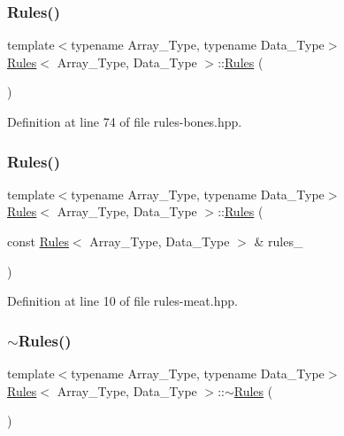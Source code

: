 \subsubsection{\texorpdfstring{Rules()}{Rules()}\hspace{0.1cm}{\footnotesize\ttfamily [1/2]}}
{\footnotesize\ttfamily template$<$typename Array\+\_\+\+Type, typename Data\+\_\+\+Type$>$ \\
\hyperlink{class_rules}{Rules}$<$ Array\+\_\+\+Type, Data\+\_\+\+Type $>$\+::\hyperlink{class_rules}{Rules} (\begin{DoxyParamCaption}{ }\end{DoxyParamCaption})\hspace{0.3cm}{\ttfamily [inline]}}



Definition at line 74 of file rules-\/bones.\+hpp.

\mbox{\label{class_rules_a57f5ab44febba391b2a06d163d25b237}} 
\subsubsection{\texorpdfstring{Rules()}{Rules()}\hspace{0.1cm}{\footnotesize\ttfamily [2/2]}}
{\footnotesize\ttfamily template$<$typename Array\+\_\+\+Type, typename Data\+\_\+\+Type$>$ \\
\hyperlink{class_rules}{Rules}$<$ Array\+\_\+\+Type, Data\+\_\+\+Type $>$\+::\hyperlink{class_rules}{Rules} (\begin{DoxyParamCaption}\item[{const \hyperlink{class_rules}{Rules}$<$ Array\+\_\+\+Type, Data\+\_\+\+Type $>$ \&}]{rules\+\_\+ }\end{DoxyParamCaption})\hspace{0.3cm}{\ttfamily [inline]}}



Definition at line 10 of file rules-\/meat.\+hpp.

\mbox{\label{class_rules_aa76d96c2316bc4a2a26bf4ec7b8d9463}} 
\subsubsection{\texorpdfstring{$\sim$\+Rules()}{~Rules()}}
{\footnotesize\ttfamily template$<$typename Array\+\_\+\+Type, typename Data\+\_\+\+Type$>$ \\
\hyperlink{class_rules}{Rules}$<$ Array\+\_\+\+Type, Data\+\_\+\+Type $>$\+::$\sim$\hyperlink{class_rules}{Rules} (\begin{DoxyParamCaption}{ }\end{DoxyParamCaption})\hspace{0.3cm}{\ttfamily [inline]}}



